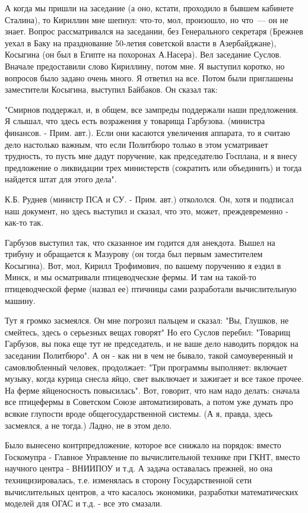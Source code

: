 \documentclass{article}
\begin{document}
А когда мы пришли на заседание (а оно, кстати, проходило в бывшем кабинете
Сталина), то Кириллин мне шепнул: что-то, мол, произошло, но что\ --- он не
знает. Вопрос рассматривался на заседании, без Генерального секретаря (Брежнев
уехал в Баку на празднование 50-летия советской власти в Азербайджане), Косыгина
(он был в Египте на похоронах А.Насера). Вел заседание Суслов. Вначале
предоставили слово Кириллину, потом мне. Я выступил коротко, но вопросов было
задано очень много. Я ответил на все. Потом были приглашены заместители
Косыгина, выступил Байбаков. Он сказал так:

"Смирнов поддержал, и, в общем, все зампреды поддержали наши предложения. Я
слышал, что здесь есть возражения у товарища Гарбузова. (министра финансов. -
Прим. авт.). Если они касаются увеличения аппарата, то я считаю дело настолько
важным, что если Политбюро только в этом усматривает трудность, то пусть мне
дадут поручение, как председателю Госплана, и я внесу предложение о ликвидации
трех министерств (сократить или объединить) и тогда найдется штат для этого
дела".

К.Б. Руднев (министр ПСА и СУ. - Прим. авт.) откололся. Он, хотя и подписал наш
документ, но здесь выступил и сказал, что это, может, преждевременно - как-то
так.

Гарбузов выступил так, что сказанное им годится для анекдота. Вышел на трибуну и
обращается к Мазурову (он тогда был первым заместителем Косыгина). Вот, мол,
Кирилл Трофимович, по вашему поручению я ездил в Минск, и мы осматривали
птицеводческие фермы. И там на такой-то птицеводческой ферме (назвал ее)
птичницы сами разработали вычислительную машину.

Тут я громко засмеялся. Он мне погрозил пальцем и сказал: "Вы, Глушков, не
смейтесь, здесь о серьезных вещах говорят" Но его Суслов перебил: "Товарищ
Гарбузов, вы пока еще тут не председатель, и не ваше дело наводить порядок на
заседании Политбюро". А он - как ни в чем не бывало, такой самоуверенный и
самовлюбленный человек, продолжает: "Три программы выполняет: включает музыку,
когда курица снесла яйцо, свет выключает и зажигает и все такое прочее. На ферме
яйценосность повысилась". Вот, говорит, что нам надо делать: сначала все
птицефермы в Советском Союзе автоматизировать, а потом уже думать про всякие
глупости вроде общегосударственной системы. (А я, правда, здесь засмеялся, а не
тогда.) Ладно, не в этом дело.

Было вынесено контрпредложение, которое все снижало на порядок: вместо
Госкомупра - Главное Управление по вычислительной технике при ГКНТ, вместо
научного центра - ВНИИПОУ и т.д. А задача оставалась прежней, но она
техницизировалась, т.е. изменялась в сторону Государственной сети вычислительных
центров, а что касалось экономики, разработки математических моделей для ОГАС и
т.д. - все это смазали.
\end{document}
